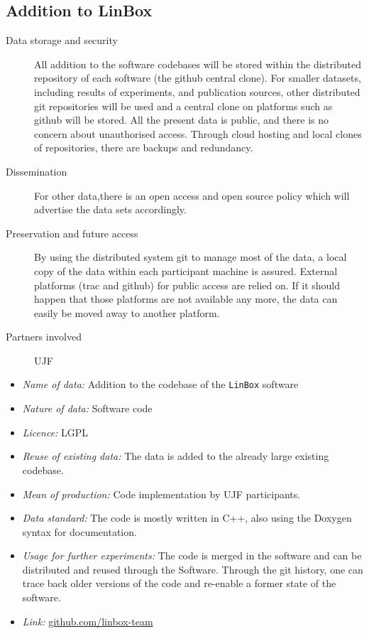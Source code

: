 \documentclass{../../Proposal/LaTeX-proposal/deliverablereport}
\begin{document}
\begin{enumerate}
\subsection{Addition to LinBox}

\begin{description}
\item[Data storage and security] All addition to the software codebases will be stored within the distributed repository of each software (the github central clone). For smaller datasets, including results of experiments, and publication sources, other distributed git repositories will be used and a central clone on platforms such as github will be stored. All the present data is public, and there is no concern about unauthorised access. Through cloud hosting and local clones of repositories, there are backups and redundancy.
\item[Dissemination] For other data,there is an open access and open source policy which will advertise the data sets accordingly.
\item[Preservation and future access] By using the distributed system git to manage most of the data, a local copy of the data within each participant machine is assured. External platforms (trac and github) for public access are relied on. If it should happen that those platforms are not available any more, the data can easily be moved away to another platform.
\item[Partners involved] UJF
\end{description}

\begin{itemize}
\item\textit{Name of data:} Addition to the codebase of the \texttt{LinBox} software
\item\textit{Nature of data:} Software code
\item\textit{Licence:} LGPL
\item\textit{Reuse of existing data:} The data is added to the already large existing codebase.
\item\textit{Mean of production:} Code implementation by UJF participants.
\item\textit{Data standard:} The code is mostly written in C++, also using the Doxygen syntax for documentation.
\item\textit{Usage for further experiments:} The code is merged in the software and can be distributed and reused through the Software. Through the git history,
one can trace back older versions of the code and re-enable a former state of the software.
\item\textit{Link:} \href{https://github.com/linbox-team}{github.com/linbox-team}
\end{itemize}




\end{enumerate}
\end{document}
